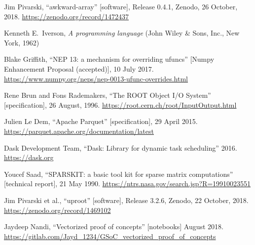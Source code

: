 \documentclass{webofc}
\begin{document}
\begin{thebibliography}{8}

 Jim Pivarski, ``awkward-array'' [software], Release 0.4.1, Zenodo, 26 October, 2018. \textcolor{blue}{\url{https://zenodo.org/record/1472437}}

 Kenneth E.\ Iverson, \textit{A programming language} (John Wiley \& Sons, Inc., New York, 1962)

 Blake Griffith, ``NEP 13: a mechanism for overriding ufuncs'' [Numpy Enhancement Proposal (accepted)], 10 July 2017. \textcolor{blue}{\url{https://www.numpy.org/neps/nep-0013-ufunc-overrides.html}}

 Rene Brun and Fons Rademakers, ``The ROOT Object I/O System'' [specification], 26 August, 1996. \textcolor{blue}{\url{https://root.cern.ch/root/InputOutput.html}}

 Julien Le Dem, ``Apache Parquet'' [specification], 29 April 2015. \textcolor{blue}{\url{https://parquet.apache.org/documentation/latest}}

 Dask Development Team, ``Dask: Library for dynamic task scheduling'' 2016. \textcolor{blue}{\url{https://dask.org}}

 Youcef Saad, ``SPARSKIT: a basic tool kit for sparse matrix computations'' [technical report], 21 May 1990. \textcolor{blue}{\url{https://ntrs.nasa.gov/search.jsp?R=19910023551}}

 Jim Pivarski et al., ``uproot'' [software], Release 3.2.6, Zenodo, 22 October, 2018. \textcolor{blue}{\url{https://zenodo.org/record/1469102}}

 Jaydeep Nandi, ``Vectorized proof of concepts'' [notebooks] August 2018. \textcolor{blue}{\url{https://gitlab.com/Jayd_1234/GSoC_vectorized_proof_of_concepts}}

\end{thebibliography}
\end{document}
